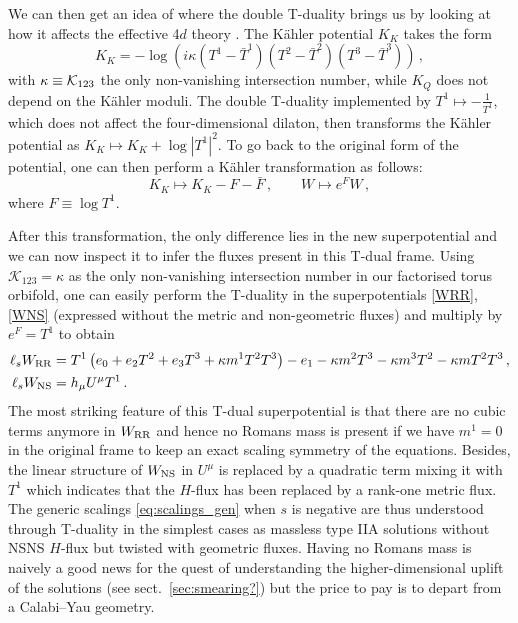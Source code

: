 \documentclass[11pt, a4paper]{article}
\newcommand{\K}{{\cal K}}
\newcommand{\cK}{\mathcal{K}}
\begin{document}
We can then get an idea of where the double T-duality brings us by looking at how it affects the effective 4$d$ theory \cite{Banks:2006hg,Carrasco:2023hta}. The Kähler potential $K_K$ takes the form
\begin{equation}
K_K=-\log\left(i\kappa(T^1-\bar T^1)(T^2-\bar T^2)(T^3-\bar T^3)\right)\, ,   
\end{equation}
%
with $\kappa\equiv\K_{123}$ the only non-vanishing intersection number, while $K_Q$ does not depend on the Kähler moduli. The double T-duality implemented by $T^1\mapsto-\frac{1}{T^1}$, which does not affect the four-dimensional dilaton, then transforms the Kähler potential as $K_K\mapsto K_K+\log|T^1|^2$. To go back to the original form of the potential, one can then perform a Kähler transformation as follows:
\begin{equation}
K_K\mapsto K_K-F-\bar F\, ,\qquad W\mapsto e^F W\, ,    
\end{equation}
%
where $F\equiv\log T^1$.

After this transformation, the only difference lies in the new superpotential and we can now inspect it to infer the fluxes present in this T-dual frame. Using $\cK_{123}=\kappa$ as the only non-vanishing intersection number in our factorised torus orbifold, one can easily perform the T-duality in the superpotentials \eqref{WRR}, \eqref{WNS} (expressed without the metric and non-geometric fluxes) and multiply by $e^F=T^1$ to obtain
\begin{subequations}
\label{newW}
\begin{align}
\ell_s W_{\rm RR}  &= T^1\left(e_0 + e_2T^2+e_3T^3 + \kappa m^1T^2T^3\right) - e_1 -\kappa m^2T^3 - \kappa m^3 T^2 - \kappa mT^2T^3\, , 
\label{newWRR} \\
\ell_s W_{\rm NS} & =  h_\mu U^\mu T^1\, .
\label{newWNS}
\end{align}
\end{subequations}
%
The most striking feature of this T-dual superpotential is that there are no cubic terms anymore in $W_{\rm RR}$ and hence no Romans mass is present if we have $m^1=0$ in the original frame to keep an exact scaling symmetry of the equations. Besides, the linear structure of $W_{\rm NS}$ in $U^\mu$ is replaced by a quadratic term mixing it with $T^1$ which indicates that the $H$-flux has been replaced by a rank-one metric flux. The generic scalings \eqref{eq:scalings_gen} when $s$ is negative are thus understood through T-duality in the simplest cases as massless type IIA solutions without NSNS $H$-flux but twisted with geometric fluxes. Having no Romans mass is naively a good news for the quest of understanding the higher-dimensional uplift of the solutions (see sect.~\ref{sec:smearing?}) but the price to pay is to depart from a Calabi--Yau geometry.
\end{document}
